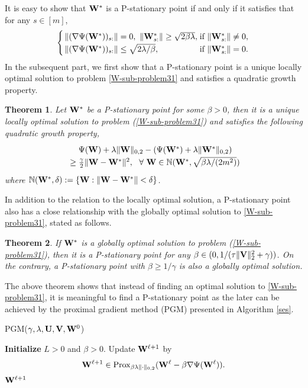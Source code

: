 \documentclass[journal]{IEEEtran}
\newtheorem{theorem}{Theorem}
\newcommand{\ba}{\begin{array}}
\newcommand{\ea}{\end{array}}
\newcommand{\be}{\begin{equation}}
\newcommand{\ee}{\end{equation}}
\def\U{{\bf U}}
\def\V{{\bf V}}
\def\W{{\bf W}}
\begin{document}
It is easy to show that $\W^*$ is a P-stationary point if and only if it satisfies that for any $s\in[m]$,
 \be \label{P-equivalent}
  \arraycolsep=1.4pt\def\arraystretch{1.25}
\left\{ \ba{lll}
\|(\nabla \Psi(\W^*))_{s:}\|=0,~ \|\W^*_{s:}\|\geq
\sqrt{2\beta\lambda}, & \text{if} ~ \|\W^*_{s:}\|\neq 0, \\
\|(\nabla \Psi(\W^*))_{s:}\|\leq \sqrt{2\lambda/\beta}, & \text{if} ~ \|\W^*_{s:}\|= 0.
 \ea \right.
 \ee
In the subsequent part, we first show that a P-stationary point is a unique locally optimal solution  to problem \eqref{W-sub-problem31} and satisfies a quadratic growth property.
 \begin{theorem} \label{P-first-order-local}
Let $\W^*$ be a P-stationary point for some $\beta>0$, then it is a unique locally optimal solution to problem (\ref{W-sub-problem31}) and satisfies the following quadratic growth property,
 \be \label{quadratic-growth-property}
  \arraycolsep=1.4pt\def\arraystretch{1.25}
\ba{lll}
&&\Psi(\W) + \lambda\|\W\|_{0,2} -( \Psi(\W^*) + \lambda\|\W^*\|_{0,2})\\
&  \geq & \frac{\gamma}{2} \|\W -\W^*\|^2,~~\forall ~\W\in{\mathbb N}(\W^*, \sqrt{\beta\lambda/(2m^2)})
 \ea
 \ee
where $ {\mathbb N}(\W^*, \delta):= \{\W: \|\W -\W^*\|<\delta\}$.
\end{theorem}
In addition to the relation to the locally optimal solution,
 a P-stationary point also has a close relationship with the globally optimal solution to   \eqref{W-sub-problem31}, stated as follows.
\begin{theorem} \label{P-first-order}
If $\W^*$ is a globally optimal solution to problem (\ref{W-sub-problem31}), then it is a P-stationary point for any $\beta\in(0,1/(\tau \|\V\|_2^2+\gamma))$. On the contrary, a P-stationary point with $\beta\geq 1/\gamma$ is also a globally optimal solution.
\end{theorem}
The above theorem shows that instead of finding an optimal solution to \eqref{W-sub-problem31}, it is meaningful to find a P-stationary point as the later can be achieved by the proximal gradient method (PGM) \cite{Beck2019} presented in Algorithm \ref{ses}.
 \begin{algorithm}[H] \caption{PGM($ \gamma,  \lambda, \U, \V, \W^0$)}\label{ses}
	\begin{algorithmic}[1]
\STATE \textbf{Initialize}   $L>0$ and  $\beta>0$.
	 \STATE  Update  $\W^{\ell+1}$ by
	  \be\label{P-CW-l}
    \W^{\ell+1} \in {\rm Prox}_{\beta \lambda\|\cdot\|_{0,2}}(\W^{\ell}-\beta \nabla \Psi(\W^{\ell})).\ee
\ENDFOR
\RETURN $\W^{\ell+1}$
	\end{algorithmic}
\end{algorithm}
\end{document}
